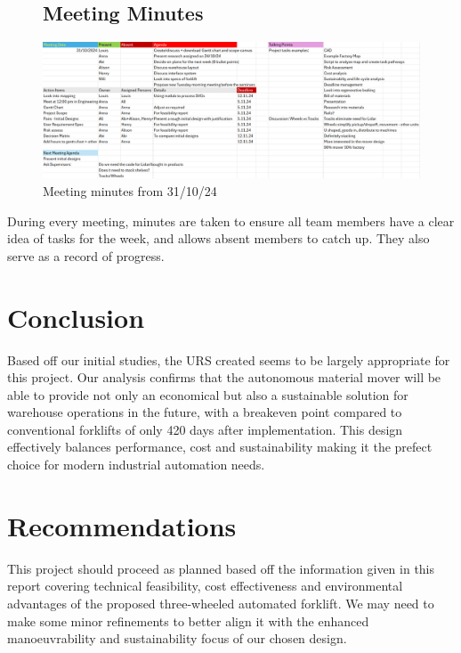 \documentclass[12pt]{article}
\begin{document}
\begin{figure}
 \subsection{Meeting Minutes}
    \includegraphics[width=1\textwidth]{HalloweenMinutes1.png}
    \caption{Meeting minutes from 31/10/24}
    \label{fig:y}
\end{figure}
  \FloatBarrier
During every meeting, minutes are taken to ensure all team members have a clear idea of tasks for the week, and allows absent members to catch up. They also serve as a record of progress.

\FloatBarrier

\section{Conclusion}
Based off our initial studies, the URS created seems to be largely appropriate for this project. Our analysis confirms that the autonomous material mover will be able to provide not only an economical but also a sustainable solution for warehouse operations in the future, with a breakeven point compared to conventional forklifts of only 420 days after implementation. This design effectively balances performance, cost and sustainability making it the prefect choice for modern industrial automation needs.

\section{Recommendations}
This project should proceed as planned based off the information given in this report covering technical feasibility, cost effectiveness and environmental advantages of the proposed three-wheeled automated forklift. We may need to make some minor refinements to better align it with the enhanced manoeuvrability and sustainability focus of our chosen design.

\printbibliography
\end{document}
